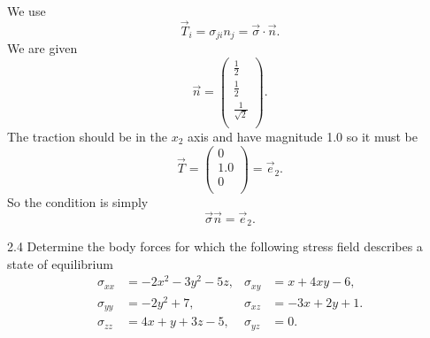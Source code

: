 \begin{derivation}
  We use
  \begin{equation*}
    \Vec{T}_i = \sigma_{ji} n_j = \Vec{\sigma} \cdot \Vec{n}
  .\end{equation*}
  We are given
  \begin{equation*}
    \Vec{n} = \begin{pmatrix}
      \frac{1}{2}\\
    \frac{1}{2}\\
    \frac{1}{\sqrt{2}}\\
    \end{pmatrix}
  .\end{equation*}
  The traction should be in the $x_2$ axis and have magnitude \num{1,0} so it must be
  \begin{equation*}
    \Vec{T} = \begin{pmatrix}
      0\\
    \num{1,0} \\
    0\\
    \end{pmatrix} = \Vec{e}_2
  .\end{equation*}
  So the condition is simply
  \begin{equation*}
    \Vec{\sigma} \Vec{n} = \Vec{e}_2
  .\end{equation*}
\end{derivation}


\begin{problem}{2.4}
  Determine the body forces for which the following stress field describes a state of equilibrium
  \begin{align*}
    \sigma_{x x} &= - 2x^2 - 3y^2 - 5z, & \sigma_{xy} &= x + 4xy -6, \\
    \sigma_{yy} &= -2y^2 + 7, & \sigma_{xz} &= -3x + 2y + 1. \\
    \sigma_{zz} &= 4x + y + 3z - 5, & \sigma_{yz} &= 0
  .\end{align*}
\end{problem}

